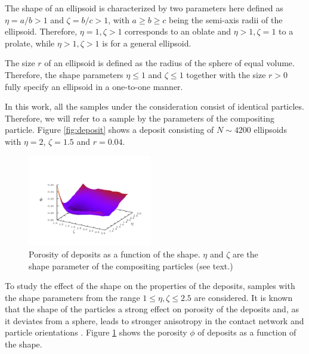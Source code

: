 \documentclass[aps,twocolumn,superscriptaddress,showpacs,showkeys]{revtex4}
\begin{document}
The shape of an ellipsoid is characterized by two parameters
here defined as $\eta=a/b>1$ and $\zeta=b/c>1$, with $a \ge b \ge c$ being 
the semi-axis radii of the ellipsoid. 
Therefore, $\eta=1,\zeta>1$ corresponds to an oblate and $\eta>1,\zeta=1$ to a prolate, 
while  $\eta>1,\zeta>1$ is for a general ellipsoid. 

The size $r$ of an ellipsoid is defined as the radius of the sphere 
of equal volume. Therefore, the shape parameters $\eta \le 1$ and $\zeta \le 1$ 
together with the size $r>0$ fully specify an ellipsoid in a one-to-one manner.
 
In this work, all the samples under the consideration consist of identical particles.  
Therefore, we will refer to a sample by the parameters of the compositing particle. 
Figure \ref{fig:deposit} shows a deposit consisting of $N\sim 4200$ ellipsoids 
with $\eta=2$, $\zeta=1.5$ and $r=0.04$.


\begin{figure}
\begin{center}
\includegraphics*[width=0.48\textwidth,angle=0]{data-figs/porosity}
\caption{\protect
	Porosity of deposits as a function of the shape. $\eta$ and $\zeta$ 
	are the shape parameter of the compositing particles (see text.)
	}
\label{fig:porosity}
\end{center}
\end{figure}

To study the effect of the shape on the properties of the deposits, 
samples with the shape parameters from the range $1 \le \eta, \zeta \le 2.5$ 
are considered. It is known that the shape of the particles a strong effect on 
porosity of the deposits and, as it deviates from a sphere, leads to stronger 
anisotropy in the contact network and particle orientations \cite{ref:reza-pedro2011}. 
Figure \ref{fig:porosity} shows the porosity $\phi$ of deposits as a function of the shape. 

\end{document}
